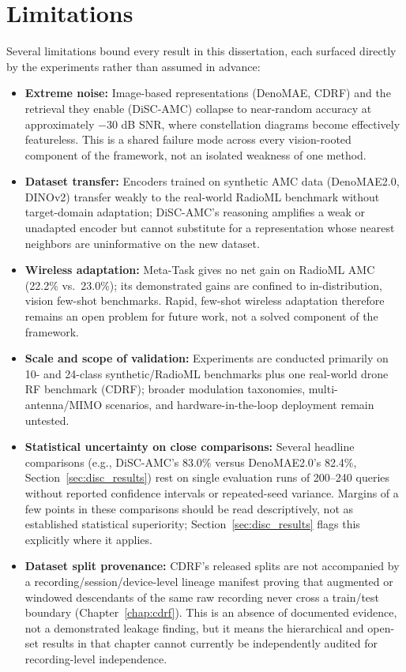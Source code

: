 \section{Limitations}
Several limitations bound every result in this dissertation, each surfaced directly by the experiments rather than assumed in advance:
\begin{itemize}
    \item \textbf{Extreme noise:} Image-based representations (DenoMAE, CDRF) and the retrieval they enable (DiSC-AMC) collapse to near-random accuracy at approximately $-30$ dB SNR, where constellation diagrams become effectively featureless. This is a shared failure mode across every vision-rooted component of the framework, not an isolated weakness of one method.
    \item \textbf{Dataset transfer:} Encoders trained on synthetic AMC data (DenoMAE2.0, DINOv2) transfer weakly to the real-world RadioML benchmark without target-domain adaptation; DiSC-AMC's reasoning amplifies a weak or unadapted encoder but cannot substitute for a representation whose nearest neighbors are uninformative on the new dataset.
    \item \textbf{Wireless adaptation:} Meta-Task gives no net gain on RadioML AMC (22.2\% vs.\ 23.0\%); its demonstrated gains are confined to in-distribution, vision few-shot benchmarks. Rapid, few-shot wireless adaptation therefore remains an open problem for future work, not a solved component of the framework.
    \item \textbf{Scale and scope of validation:} Experiments are conducted primarily on 10- and 24-class synthetic/RadioML benchmarks plus one real-world drone RF benchmark (CDRF); broader modulation taxonomies, multi-antenna/MIMO scenarios, and hardware-in-the-loop deployment remain untested.
    \item \textbf{Statistical uncertainty on close comparisons:} Several headline comparisons (e.g., DiSC-AMC's 83.0\% versus DenoMAE2.0's 82.4\%, Section~\ref{sec:disc_results}) rest on single evaluation runs of 200--240 queries without reported confidence intervals or repeated-seed variance. Margins of a few points in these comparisons should be read descriptively, not as established statistical superiority; Section~\ref{sec:disc_results} flags this explicitly where it applies.
    \item \textbf{Dataset split provenance:} CDRF's released splits are not accompanied by a recording/session/device-level lineage manifest proving that augmented or windowed descendants of the same raw recording never cross a train/test boundary (Chapter~\ref{chap:cdrf}). This is an absence of documented evidence, not a demonstrated leakage finding, but it means the hierarchical and open-set results in that chapter cannot currently be independently audited for recording-level independence.

\end{itemize}

